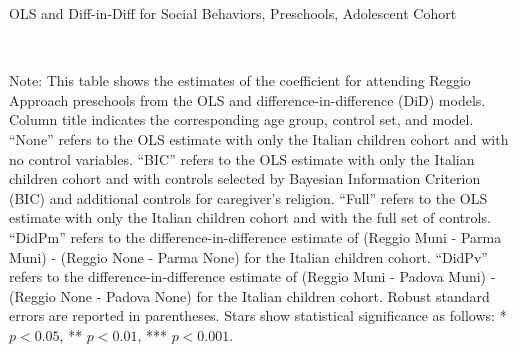 
\begin{table}[H] \caption{OLS and Diff-in-Diff for Social Behaviors, Preschools, Adolescent Cohort} \label{ols-H-reg}
\scalebox{0.77}{
}
\vspace{1ex} \\
\footnotesize\raggedright{Note: This table shows the estimates of the coefficient for attending Reggio Approach preschools from the OLS and difference-in-difference (DiD) models. Column title indicates the corresponding age group, control set, and model. ``None'' refers to the OLS estimate with only the Italian children cohort and with no control variables. ``BIC'' refers to the OLS estimate with only the Italian children cohort and with controls selected by Bayesian Information Criterion (BIC) and additional controls for caregiver's religion. ``Full'' refers to the OLS estimate with only the Italian children cohort and with the full set of controls. ``DidPm'' refers to the difference-in-difference estimate of (Reggio Muni - Parma Muni) - (Reggio None - Parma None) for the Italian children cohort. ``DidPv'' refers to the difference-in-difference estimate of (Reggio Muni - Padova Muni) - (Reggio None - Padova None) for the Italian children cohort.  Robust standard errors are reported in parentheses. Stars show statistical significance as follows: * $p < 0.05$, ** $p < 0.01$, *** $p < 0.001$.}
\end{table}










